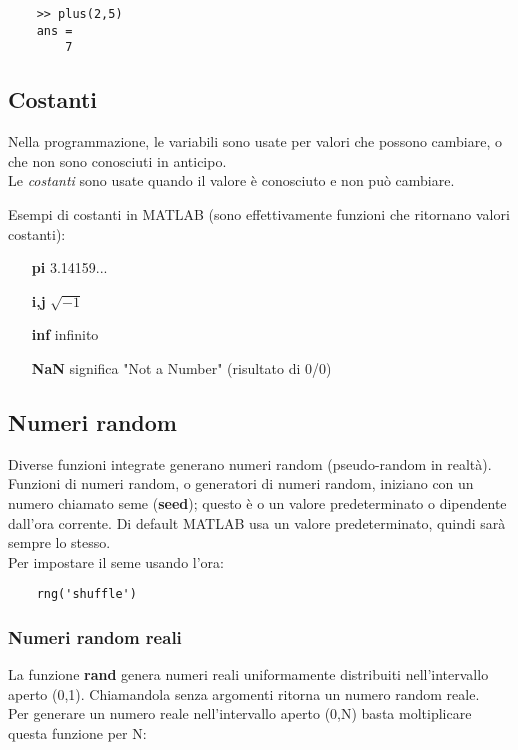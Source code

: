 \documentclass[a4paper, 10pt]{article}
\begin{document}
	\begin{lstlisting}
	>> plus(2,5)
	ans =
		7
	\end{lstlisting}
	
\subsection{Costanti}
Nella programmazione, le variabili sono usate per valori che possono cambiare, o che non sono conosciuti in anticipo.\\
Le \textit{costanti} sono usate quando il valore è conosciuto e non può cambiare.

Esempi di costanti in MATLAB (sono effettivamente funzioni che ritornano valori costanti):

\begin{itemize}
\item[\textbf{pi}] 3.14159...
\item[\textbf{i,j}] $\sqrt{-1}$
\item[\textbf{inf}] infinito
\item[\textbf{NaN}] significa "Not a Number" (risultato di 0/0)
\end{itemize}

\subsection{Numeri random}
Diverse funzioni integrate generano numeri random (pseudo-random in realtà). Funzioni di numeri random, o generatori di numeri random, iniziano con un numero chiamato seme (\textbf{seed}); questo è o un valore predeterminato o dipendente dall'ora corrente.
Di default MATLAB usa un valore predeterminato, quindi sarà sempre lo stesso. \\
Per impostare il seme usando l'ora:

	\begin{lstlisting}
	rng('shuffle')
	\end{lstlisting}
	
\subsubsection{Numeri random reali}
La funzione \textbf{rand} genera numeri reali uniformamente distribuiti nell'intervallo aperto (0,1). Chiamandola senza argomenti ritorna un numero random reale. \\
Per generare un numero reale nell'intervallo aperto (0,N) basta moltiplicare questa funzione per N:
\end{document}
